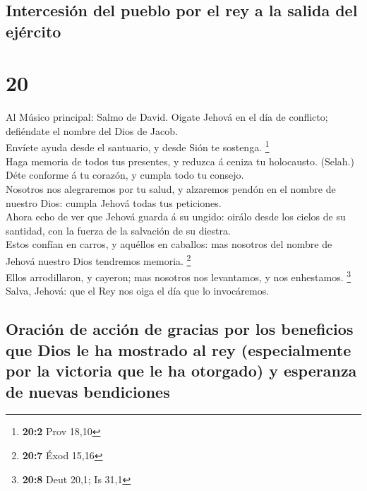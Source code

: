 \hypertarget{intercesiuxf3n-del-pueblo-por-el-rey-a-la-salida-del-ejuxe9rcito}{%
\subsection{Intercesión del pueblo por el rey a la salida del
ejército}\label{intercesiuxf3n-del-pueblo-por-el-rey-a-la-salida-del-ejuxe9rcito}}

\hypertarget{section-19}{%
\section{20}\label{section-19}}

 Al Músico principal: Salmo de David. Oigate Jehová en el
día de conflicto; defiéndate el nombre del Dios de Jacob.\\
 Envíete ayuda desde el santuario, y desde Sión te
sostenga. \footnote{\textbf{20:2} Prov 18,10}\\
 Haga memoria de todos tus presentes, y reduzca á ceniza
tu holocausto. (Selah.)\\
 Déte conforme á tu corazón, y cumpla todo tu consejo.\\
 Nosotros nos alegraremos por tu salud, y alzaremos pendón
en el nombre de nuestro Dios: cumpla Jehová todas tus peticiones.\\
 Ahora echo de ver que Jehová guarda á su ungido: oirálo
desde los cielos de su santidad, con la fuerza de la salvación de su
diestra.\\
 Estos confían en carros, y aquéllos en caballos: mas
nosotros del nombre de Jehová nuestro Dios tendremos memoria.
\footnote{\textbf{20:7} Éxod 15,16}\\
 Ellos arrodillaron, y cayeron; mas nosotros nos
levantamos, y nos enhestamos. \footnote{\textbf{20:8} Deut 20,1; Is 31,1}\\
 Salva, Jehová: que el Rey nos oiga el día que lo
invocáremos.

\hypertarget{oraciuxf3n-de-acciuxf3n-de-gracias-por-los-beneficios-que-dios-le-ha-mostrado-al-rey-especialmente-por-la-victoria-que-le-ha-otorgado-y-esperanza-de-nuevas-bendiciones}{%
\subsection{Oración de acción de gracias por los beneficios que Dios le
ha mostrado al rey (especialmente por la victoria que le ha otorgado) y
esperanza de nuevas
bendiciones}\label{oraciuxf3n-de-acciuxf3n-de-gracias-por-los-beneficios-que-dios-le-ha-mostrado-al-rey-especialmente-por-la-victoria-que-le-ha-otorgado-y-esperanza-de-nuevas-bendiciones}}

